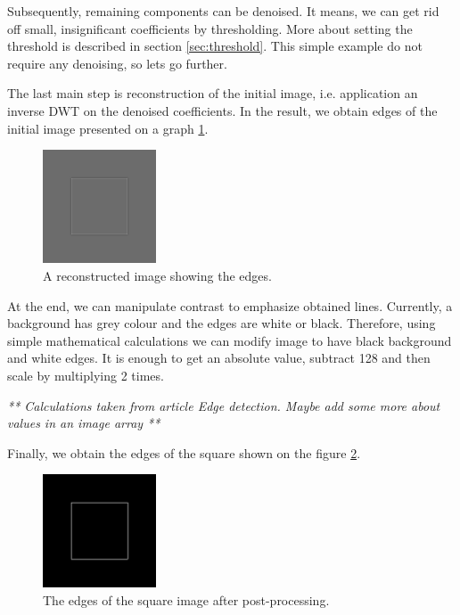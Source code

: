 Subsequently, remaining components can be denoised. It means, we can get rid off small, insignificant coefficients by thresholding. More about setting the threshold is described in section \ref{sec:threshold}. This simple example do not require any denoising, so lets go further.

The last main step is reconstruction of the initial image, i.e. application an inverse DWT on the denoised coefficients. In the result, we obtain edges of the initial image presented on a graph \ref{fig:square_idwt}.

\begin{figure}[h]
	\centering
	\includegraphics[width=0.3\textwidth]{graphs/square_db2.png}
	\caption{A reconstructed image showing the edges.}
	\label{fig:square_idwt}
\end{figure}

At the end, we can manipulate contrast to emphasize obtained lines. Currently, a background has grey colour and the edges are white or black. Therefore, using simple mathematical calculations we can modify image to have black background and white edges. It is enough to get an absolute value, subtract 128 and then scale by multiplying 2 times.

\textit{** Calculations taken from article Edge detection. Maybe add some more about values in an image array **}

Finally, we obtain the edges of the square shown on the figure \ref{fig:square_idwt_pp}.

\begin{figure}[h]
	\centering
	\includegraphics[width=0.3\textwidth]{graphs/square_db2_pp.png}
	\caption{The edges of the square image after post-processing.}
	\label{fig:square_idwt_pp}
\end{figure}

